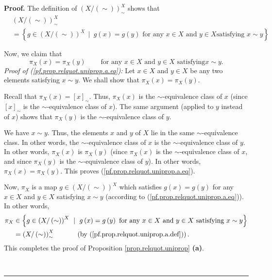 \documentclass[numbers=enddot,12pt,final,onecolumn,notitlepage]{scrartcl}%
\theoremstyle{definition}
\newenvironment{proof}[1][Proof]{\noindent\textbf{#1.} }{\ \rule{0.5em}{0.5em}}
\newenvironment{verlong}{}{}
\begin{document}
\begin{verlong}
\begin{proof}
The definition of $\left(  X/\left(  \sim\right)  \right)  _{\sim}^{X}$ shows
that%
\begin{align}
&  \left(  X/\left(  \sim\right)  \right)  _{\sim}^{X}\nonumber\\
&  =\left\{  g\in\left(  X/\left(  \sim\right)  \right)  ^{X}\ \mid\ g\left(
x\right)  =g\left(  y\right)  \text{ for any }x\in X\text{ and }y\in X\text{
satisfying }x\sim y\right\}  \label{pf.prop.relquot.uniprop.a.def}%
\end{align}


Now, we claim that
\begin{equation}
\pi_{X}\left(  x\right)  =\pi_{X}\left(  y\right)
\ \ \ \ \ \ \ \ \ \ \text{for any }x\in X\text{ and }y\in X\text{ satisfying
}x\sim y. \label{pf.prop.relquot.uniprop.a.eq}%
\end{equation}
\textit{Proof of (\ref{pf.prop.relquot.uniprop.a.eq}):} Let $x\in X$ and $y\in
X$ be any two elements satisfying $x\sim y$. We shall show that $\pi
_{X}\left(  x\right)  =\pi_{X}\left(  y\right)  $.

Recall that $\pi_{X}\left(  x\right)  =\left[  x\right]  _{\sim}$. Thus,
$\pi_{X}\left(  x\right)  $ is the $\sim$-equivalence class of $x$ (since
$\left[  x\right]  _{\sim}$ is the $\sim$-equivalence class of $x$). The same
argument (applied to $y$ instead of $x$) shows that $\pi_{X}\left(  y\right)
$ is the $\sim$-equivalence class of $y$.

We have $x\sim y$. Thus, the elements $x$ and $y$ of $X$ lie in the same
$\sim$-equivalence class. In other words, the $\sim$-equivalence class of $x$
is the $\sim$-equivalence class of $y$. In other words, $\pi_{X}\left(
x\right)  $ is $\pi_{X}\left(  y\right)  $ (since $\pi_{X}\left(  x\right)  $
is the $\sim$-equivalence class of $x$, and since $\pi_{X}\left(  y\right)  $
is the $\sim$-equivalence class of $y$). In other words, $\pi_{X}\left(
x\right)  =\pi_{X}\left(  y\right)  $. This proves
(\ref{pf.prop.relquot.uniprop.a.eq}).

Now, $\pi_{X}$ is a map $g\in\left(  X/\left(  \sim\right)  \right)  ^{X}$
which satisfies $g\left(  x\right)  =g\left(  y\right)  $ for any $x\in X$ and
$y\in X$ satisfying $x\sim y$ (according to
(\ref{pf.prop.relquot.uniprop.a.eq})). In other words,%
\begin{align*}
\pi_{X}  &  \in\left\{  g\in\left(  X/\left(  \sim\right)  \right)  ^{X}%
\ \mid\ g\left(  x\right)  =g\left(  y\right)  \text{ for any }x\in X\text{
and }y\in X\text{ satisfying }x\sim y\right\} \\
&  =\left(  X/\left(  \sim\right)  \right)  _{\sim}^{X}%
\ \ \ \ \ \ \ \ \ \ \left(  \text{by (\ref{pf.prop.relquot.uniprop.a.def}%
)}\right)  .
\end{align*}
This completes the proof of Proposition \ref{prop.relquot.uniprop}
\textbf{(a)}.


\end{proof}
\end{verlong}
\end{document}
